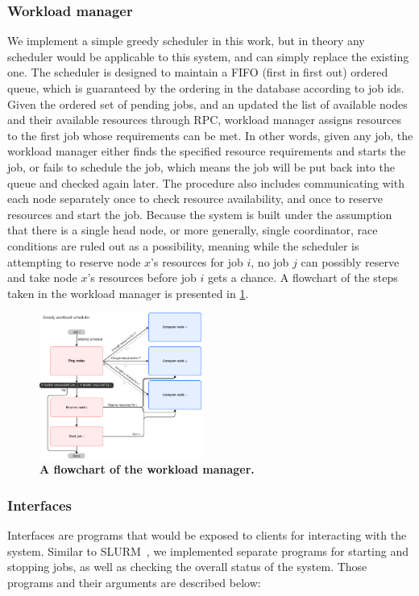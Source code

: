 \documentclass[sigconf]{acmart}
\begin{document}
\subsubsection{Workload manager}
\label{sec:wlm}
We implement a simple greedy scheduler in this work, but in theory any scheduler would be applicable to this system, and can
simply replace the existing one.
The scheduler is designed to maintain a FIFO (first in first out) ordered queue, which is guaranteed by the ordering in the
database according to job ids.
Given the ordered set of pending jobs, and an updated the list of available nodes and their available resources through
RPC, workload manager assigns resources to the first job whose requirements can be met.
In other words, given any job, the workload manager either finds the specified resource requirements and starts the job, or
fails to schedule the job, which means the job will be put back into the queue and checked again later.
The procedure also includes communicating with each node separately once to check resource availability, and once to reserve
resources and start the job.
Because the system is built under the assumption that there is a single head node, or more generally, single coordinator, race
conditions are ruled out as a possibility, meaning while the scheduler is attempting to reserve node $x$'s resources for job
$i$, no job $j$ can possibly reserve and take node $x$'s resources before job $i$ gets a chance.
A flowchart of the steps taken in the workload manager is presented in \cref{fig:wlm}.

\begin{figure}[ht]
    \centering
    \includegraphics[width=0.475\textwidth]{figures/wlm.pdf}
    \caption{
        \textbf{A flowchart of the workload manager.}
    }
    \label{fig:wlm}
\end{figure}

\subsubsection{Interfaces}
Interfaces are programs that would be exposed to clients for interacting with the system.
Similar to SLURM~\cite{yoo2003slurm}, we implemented separate programs for starting and stopping jobs, as well as checking the
overall status of the system.
Those programs and their arguments are described below:
\end{document}
